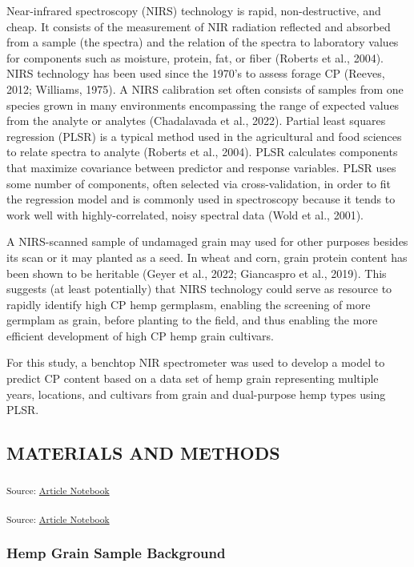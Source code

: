 \documentclass[
]{agujournal2019}
\begin{document}
Near-infrared spectroscopy (NIRS) technology is rapid, non-destructive,
and cheap. It consists of the measurement of NIR radiation reflected and
absorbed from a sample (the spectra) and the relation of the spectra to
laboratory values for components such as moisture, protein, fat, or
fiber (Roberts et al., 2004). NIRS technology has been used since the
1970's to assess forage CP (Reeves, 2012; Williams, 1975). A NIRS
calibration set often consists of samples from one species grown in many
environments encompassing the range of expected values from the analyte
or analytes (Chadalavada et al., 2022). Partial least squares regression
(PLSR) is a typical method used in the agricultural and food sciences to
relate spectra to analyte (Roberts et al., 2004). PLSR calculates
components that maximize covariance between predictor and response
variables. PLSR uses some number of components, often selected via
cross-validation, in order to fit the regression model and is commonly
used in spectroscopy because it tends to work well with
highly-correlated, noisy spectral data (Wold et al., 2001).

A NIRS-scanned sample of undamaged grain may used for other purposes
besides its scan or it may planted as a seed. In wheat and corn, grain
protein content has been shown to be heritable (Geyer et al., 2022;
Giancaspro et al., 2019). This suggests (at least potentially) that NIRS
technology could serve as resource to rapidly identify high CP hemp
germplasm, enabling the screening of more germplam as grain, before
planting to the field, and thus enabling the more efficient development
of high CP hemp grain cultivars.

For this study, a benchtop NIR spectrometer was used to develop a model
to predict CP content based on a data set of hemp grain representing
multiple years, locations, and cultivars from grain and dual-purpose
hemp types using PLSR.

\subsection{MATERIALS AND METHODS}\label{materials-and-methods}

\textsubscript{Source:
\href{https://rvcrawford.github.io/glowing-system/index.qmd.html}{Article
Notebook}}

\textsubscript{Source:
\href{https://rvcrawford.github.io/glowing-system/index.qmd.html}{Article
Notebook}}

\subsubsection{Hemp Grain Sample
Background}\label{hemp-grain-sample-background}
\end{document}
